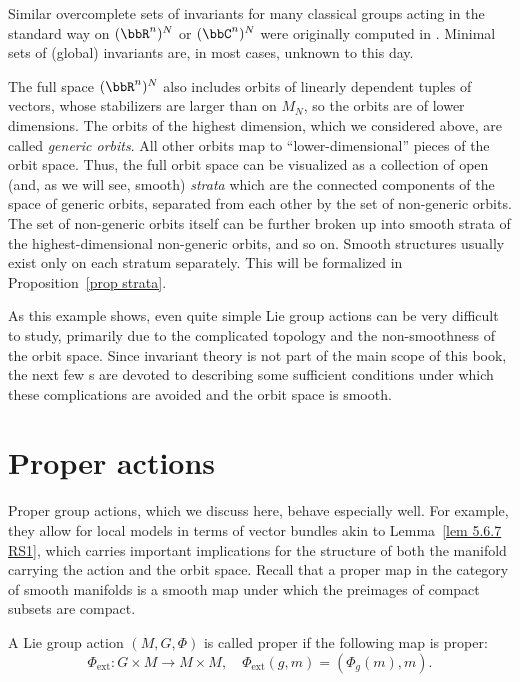 \begin{example}
    Similar overcomplete sets of invariants for many classical groups acting in the standard way on $(\bbR^n)^N$ or $(\bbC^n)^N$ were originally computed in \cite{Weyl}. Minimal sets of (global) invariants are, in most cases, unknown to this day.

    The full space $(\bbR^n)^N$ also includes orbits of linearly dependent tuples of vectors, whose stabilizers are larger than on $M_N$, so the orbits are of lower dimensions. The orbits of the highest dimension, which we considered above, are called \emph{generic orbits}. All other orbits map to ``lower-dimensional'' pieces of the orbit space. Thus, the full orbit space can be visualized as a collection of open (and, as we will see, smooth) \emph{strata} which are the connected components of the space of generic orbits, separated from each other by the set of non-generic orbits. The set of non-generic orbits itself can be further broken up into smooth strata of the highest-dimensional non-generic orbits, and so on. Smooth structures usually exist only on each stratum separately. This will be formalized in Proposition~\ref{prop strata}.
\end{example}

As this example shows, even quite simple Lie group actions can be very difficult to study, primarily due to the complicated topology and the non-smoothness of the orbit space. Since invariant theory is not part of the main scope of this book, the next few \sect s are devoted to describing some sufficient conditions under which these complications are avoided and the orbit space is smooth.






\section{Proper actions}


Proper group actions, which we discuss here, behave especially well. For example, they allow for local models in terms of vector bundles akin to Lemma~\ref{lem 5.6.7 RS1}, which carries important implications for the structure of both the manifold carrying the action and the orbit space. Recall that a proper map in the category of smooth manifolds is a smooth map under which the preimages of compact subsets are compact.

\begin{defn}
    A Lie group action $(M,G,\Phi)$ is called proper if the following map is proper:
    \[\Phi_{\mathrm{ext}}:G\times M\to M\times M,\quad \Phi_{\mathrm{ext}}(g,m)=\left(\Phi_g(m),m\right).\]
\end{defn}

